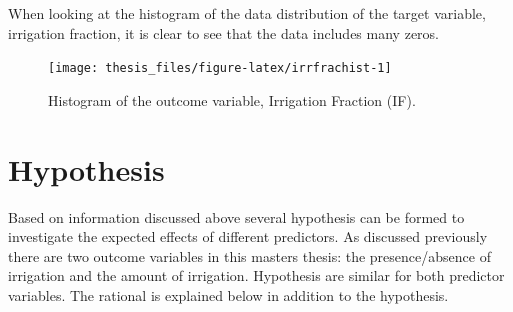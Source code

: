 \documentclass[12pt,twoside]{reedthesis}
\begin{document}
When looking at the histogram of the data distribution of the target variable, irrigation fraction, it is clear to see that the data includes many zeros.
\begin{figure}

{\centering \texttt{[image: thesis\_files/figure-latex/irrfrachist-1]} 

}

\caption[Histogram of the outcome variable, Irrigation Fraction (IF) for the entirety of the study region and period (1960 to 2005).]{Histogram of the outcome variable, Irrigation Fraction (IF).}\label{fig:irrfrachist}
\end{figure}
\hypertarget{hypothesis}{%
\section{Hypothesis}\label{hypothesis}}

Based on information discussed above several hypothesis can be formed to investigate the expected effects of different predictors. As discussed previously there are two outcome variables in this masters thesis: the presence/absence of irrigation and the amount of irrigation. Hypothesis are similar for both predictor variables. The rational is explained below in addition to the hypothesis.
\end{document}
